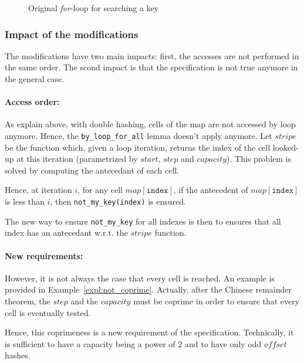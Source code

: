 \documentclass[oneside]{article}
\begin{document}
\begin{figure}[b]
	
	\caption{Original \emph{for}-loop for searching a key}
	\label{fig:for_loop_orig_pruned}
\end{figure}

\subsubsection{Impact of the modifications}
The modifications have two main impacts: first, the accesses are not performed in the same order. The scond impact is that the specification is not true anymore in the general case.

\paragraph{Access order:}
As explain above, with double hashing, cells of the map are not accessed by loop anymore. Hence, the \texttt{by\_loop\_for\_all} lemma doesn't apply anymore. Let $stripe$ be the function which, given a loop iteration, returns the index of the cell looked-up at this iteration (parametrized by $start$, $step$ and $capacity$). This problem is solved by computing the antecedant of each cell. 

Hence, at iteration $i$, for any cell $map[\mathtt{index}]$, if the antecedent of $map[\mathtt{index}]$ is less than $i$, then \texttt{not\_my\_key(index)} is ensured.

The new way to ensure \texttt{not\_my\_key} for all indexes is then to ensures that all index has an antecedant w.r.t. the $stripe$ function.

\paragraph{New requirements:}
However, it is not always the case that every cell is reached. An example is provided in Example~\ref{expl:not_coprime}. Actually, after the Chinese remainder theorem, the $step$ and the $capacity$ must be coprime in order to ensure that every cell is eventually tested.

Hence, this coprimeness is a new requirement of the specification. Technically, it is sufficient to have a capacity being a power of $2$ and to have only odd $offset$ hashes.
\end{document}
